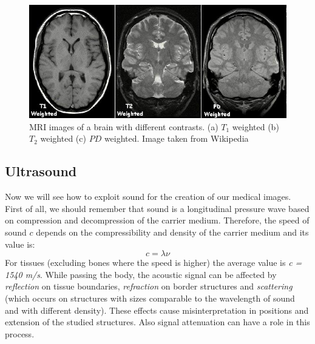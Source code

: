 \begin{figure}[htb] %
   \centering
   \includegraphics[width=0.50\linewidth]{images/mri.jpg}
   \caption[MRI of human brain]{MRI images of a brain with different contrasts. (a) $T_{1}$ weighted (b) $T_{2}$ weighted (c) $PD$ weighted. Image taken from Wikipedia}
   \label{fig:brainMRI}
\end{figure}

\subsection{Ultrasound}
Now we will see how to exploit sound for the creation of our medical images. First of all, we should remember that sound is a longitudinal pressure wave based on compression and decompression of the carrier medium. Therefore, the speed of sound $c$ depends on the compressibility and density of the carrier medium and its value is:
\begin{equation}
 c = \lambda \nu
\end{equation}
For tissues (excluding bones where the speed is higher) the average value is \textit{c = 1540 m/s}. While passing the body, the acoustic signal can be affected by \textit{reflection} on tissue boundaries, \textit{refraction} on border structures and \textit{scattering} (which occurs on structures with sizes comparable to the wavelength of sound and with different density). These effects cause misinterpretation in positions and extension of the studied structures. Also signal attenuation can have a role in this process.\\

